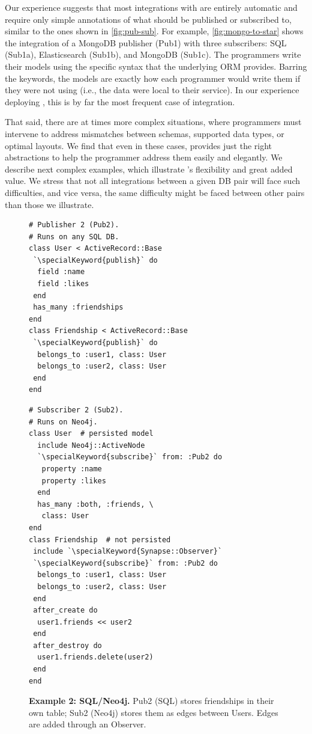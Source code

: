   Our experience suggests that most
integrations with \synapse are entirely automatic and require only simple
annotations of what should be published or subscribed to, similar to the ones shown
in \F\ref{fig:pub-sub}.  For example, \F\ref{fig:mongo-to-star} shows the
integration of a MongoDB publisher (Pub1) with three
subscribers: SQL (Sub1a), Elasticsearch (Sub1b), and
MongoDB (Sub1c). The programmers write their models using
the specific syntax that the underlying ORM
provides.  Barring the {} keywords, the
models are exactly how each programmer would write them if they were not using
\synapse (i.e., the data were local to their service).  In our experience
deploying \synapse, this is by far the most
frequent case of integration.

That said, there are at times more complex situations, where programmers must
intervene to address mismatches between schemas, supported data types, or
optimal layouts.  We find that even in these cases, \synapse provides just the
right abstractions to help the programmer address them easily and elegantly.
We describe next complex examples, which illustrate \synapse's flexibility
and great added value.  We stress that not all integrations between a given DB
pair will face such difficulties, and vice versa, the same difficulty might be
faced between other pairs than those we illustrate.





\begin{figure}
\begin{minipage}{.45\textwidth}
\begin{lstlisting}[framexleftmargin=5pt]
# Publisher 2 (Pub2).
# Runs on any SQL DB.
class User < ActiveRecord::Base
 `\specialKeyword{publish}` do
  field :name
  field :likes
 end
 has_many :friendships
end
class Friendship < ActiveRecord::Base
 `\specialKeyword{publish}` do
  belongs_to :user1, class: User
  belongs_to :user2, class: User
 end
end
\end{lstlisting}
\end{minipage}
\hfill
\begin{minipage}{.45\textwidth}
\begin{lstlisting}[framexleftmargin=5pt]
# Subscriber 2 (Sub2).
# Runs on Neo4j.
class User  # persisted model
  include Neo4j::ActiveNode
  `\specialKeyword{subscribe}` from: :Pub2 do
   property :name
   property :likes
  end
  has_many :both, :friends, \
   class: User
end
class Friendship  # not persisted
 include `\specialKeyword{Synapse::Observer}`
 `\specialKeyword{subscribe}` from: :Pub2 do
  belongs_to :user1, class: User
  belongs_to :user2, class: User
 end
 after_create do
  user1.friends << user2
 end
 after_destroy do
  user1.friends.delete(user2)
 end
end
\end{lstlisting}
\end{minipage}

\caption{{\bf Example 2: SQL/Neo4j.}
Pub2 (SQL) stores friendships in their own table; Sub2 (Neo4j) stores
them as edges between Users. Edges are added through an Observer.}
\label{fig:sql-to-neo4j}
\end{figure}

